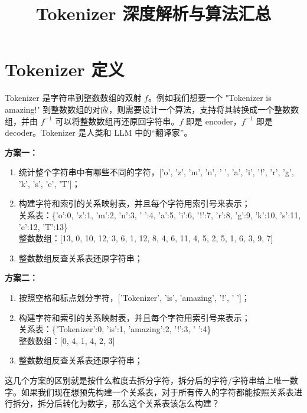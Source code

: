 \documentclass[11pt, a4paper]{article}
\title{\textbf{Tokenizer 深度解析与算法汇总}}
\author{}
\date{}
\begin{document}
\maketitle

\section{Tokenizer 定义}

Tokenizer 是字符串到整数数组的双射 $f$。例如我们想要一个 "Tokenizer is amazing!" 到整数数组的对应，则需要设计一个算法，支持将其转换成一个整数数组，并由 $f^{-1}$ 可以将整数数组再还原回字符串。$f$ 即是 encoder，$f^{-1}$ 即是 decoder。Tokenizer 是人类和 LLM 中的“翻译家”。

\begin{tcolorbox}[colback=blue!5!white, colframe=blue!75!black, title=分词方案示例]
\textbf{方案一：}
\begin{enumerate}
    \item 统计整个字符串中有哪些不同的字符，['o', 'z', 'm', 'n', ' ', 'a', 'i', '!', 'r', 'g', 'k', 's', 'e', 'T']；
    \item 构建字符和索引的关系映射表，并且每个字符用索引号来表示；\\
    关系表：\{'o':0, 'z':1, 'm':2, 'n':3, ' ':4, 'a':5, 'i':6, '!':7, 'r':8, 'g':9, 'k':10, 's':11, 'e':12, 'T':13\} \\
    整数数组：[13, 0, 10, 12, 3, 6, 1, 12, 8, 4, 6, 11, 4, 5, 2, 5, 1, 6, 3, 9, 7]
    \item 整数数组反查关系表还原字符串；
\end{enumerate}

\textbf{方案二：}
\begin{enumerate}
    \item 按照空格和标点划分字符，['Tokenizer', 'is', 'amazing', '!', ' ']；
    \item 构建字符和索引的关系映射表，并且每个字符用索引号来表示；\\
    关系表：\{'Tokenizer':0, 'is':1, 'amazing':2, '!':3, ' ':4\} \\
    整数数组：[0, 4, 1, 4, 2, 3]
    \item 整数数组反查关系表还原字符串；
\end{enumerate}
\end{tcolorbox}

这几个方案的区别就是按什么粒度去拆分字符，拆分后的字符/字符串给上唯一数字。如果我们现在想预先构建一个关系表，对于所有传入的字符都能按照关系表进行拆分，拆分后转化为数字，那么这个关系表该怎么构建？
\end{document}
